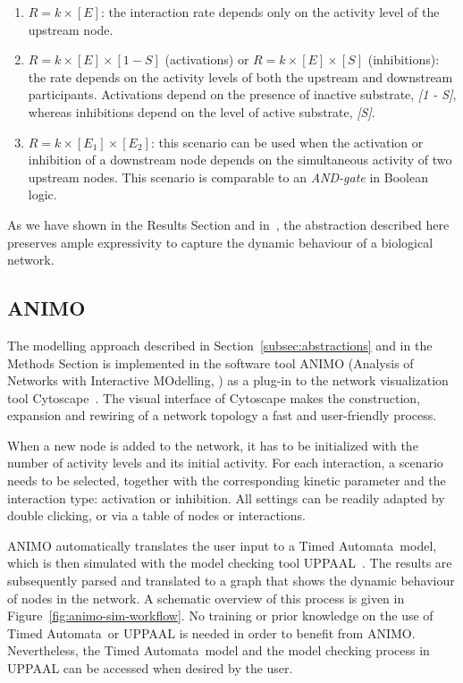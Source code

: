 \documentclass{bmcart}
\def\tas{Timed Automata}
\begin{document}
\begin{enumerate}
  \item $R = k \times [E]$: the interaction rate depends only on the activity level of the upstream node.
  \item $R = k \times [E] \times [1 - S]$ (activations) or $R = k \times [E] \times [S]$ (inhibitions): the rate
  depends on the activity levels of both the upstream and downstream participants. Activations depend on the
  presence of inactive substrate, \emph{[1 - S]}, whereas inhibitions depend on the level of active substrate,
  \emph{[S]}.
  \item $R = k \times [E_1] \times [E_2]$: this scenario can be used when the activation or inhibition
  of a downstream node depends on the simultaneous activity of two upstream nodes. This scenario is comparable to an
  \emph{AND-gate} in Boolean logic.
\end{enumerate}
As we have shown in the Results Section and in~\cite{animo-ieee,animo-gene,animo-syncop}, the abstraction described here preserves ample
expressivity to capture the dynamic behaviour of a biological network.









\subsection{ANIMO}
The modelling approach described in Section~\ref{subsec:abstractions} and in the Methods Section
is implemented in the
software tool ANIMO (Analysis of Networks with Interactive MOdelling, \cite{animo-ieee}) as
a plug-in to the network visualization tool Cytoscape~\cite{cytoscape}. The visual interface of Cytoscape
makes the construction, expansion and rewiring of a network topology a fast and user-friendly process.

When a new node is added to the network, it has to be initialized with the number of activity levels and
its initial activity.
For each interaction, a scenario needs to be selected, together with the corresponding kinetic parameter and
the interaction type: activation or inhibition. All settings can be readily adapted by double clicking, or via a
table of nodes or interactions.

ANIMO automatically translates the user input to a \tas\ model, which is then simulated with the model
checking tool UPPAAL~\cite{uppaal}. The results are subsequently parsed and translated to a graph that shows
the dynamic behaviour of nodes in the network.
A schematic overview of this process is given in Figure~\ref{fig:animo-sim-workflow}.
No training or prior knowledge on the use of \tas\ or UPPAAL is needed in order to benefit from ANIMO.
Nevertheless, the \tas\ model and the model checking process in UPPAAL can be accessed when desired by the user.
\end{document}
